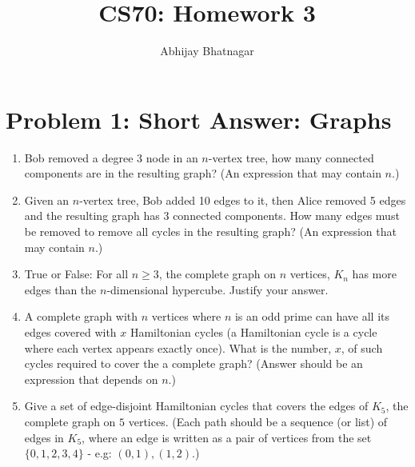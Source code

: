 \documentclass[11pt, notitlepage]{report}
\makeatletter
\newcommand*{\toccontents}{\@starttoc{toc}}
\makeatother
\begin{document}
   \title{CS70: Homework 3}
   \author{Abhijay Bhatnagar}
   \maketitle
   \toccontents



\setcounter{secnumdepth}{0} %

\section{Problem 1: Short Answer: Graphs}

\begin{enumerate}[label=(\alph*)]
\item
Bob removed a degree $3$ node in an $n$-vertex tree, how many connected
components are in the resulting graph?  (An expression that may
contain $n$.)

\item
Given an $n$-vertex tree, Bob added 10 edges to it, then Alice removed 
5 edges and the resulting graph has 3 connected components.
How many edges must be removed to remove all cycles
in the resulting graph? (An expression that may contain $n$.)


\item
True or False: For all $n \geq 3$, the complete graph on $n$ vertices, $K_n$ has more
edges than the $n$-dimensional hypercube. Justify your answer.


\item
A complete graph with $n$ vertices where $n$ is an odd prime can have all its edges
covered with $x$ Hamiltonian cycles (a Hamiltonian cycle is a cycle where
each vertex appears exactly once). What is the number, $x$,  of
such cycles required to cover the a complete graph? (Answer should be an expression that depends on $n$.)


\item
Give a set of edge-disjoint Hamiltonian cycles that covers the edges of $K_5$, the complete
graph on $5$ vertices.
(Each path should be a sequence (or list) of edges in $K_5$, where an edge is written as a pair of vertices from the set $\{0, 1, 2, 3, 4\}$ - e.g: $(0, 1), (1, 2)$.)


\end{enumerate}
\end{document}
